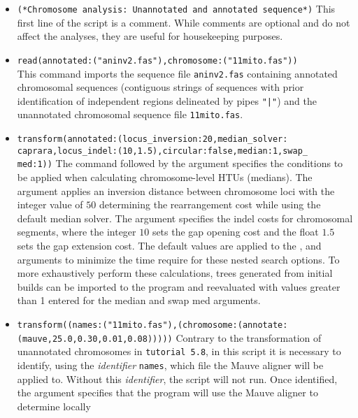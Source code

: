 \begin{itemize} 
\item \texttt{(*Chromosome analysis: Unannotated
and annotated sequence*)} This first line of the script is a comment.
While comments are optional and do not affect the analyses, they
are useful for housekeeping purposes.  
\item \texttt{read(annotated:("aninv2.fas"),chromosome:("11mito.fas"))}\\
This command imports the sequence file \texttt{aninv2.fas}
containing annotated chromosomal sequences (contiguous strings of
sequences with prior identification of independent regions delineated
by pipes \texttt{"|"}) and the unannotated chromosomal sequence
file \texttt{11mito.fas}.  
\item \texttt{transform(annotated:(locus\_inversion:20,median\_solver:\\
caprara,locus\_indel:(10,1.5),circular:false,median:1,swap\_\\
med:1))} The  command followed by the argument
 specifies the conditions to be applied when
calculating chromosome-level HTUs (medians). The argument
 applies an inversion distance between
chromosome loci with the integer value of $50$ determining the
rearrangement cost while using the default 
median solver. The argument  specifies
the indel costs for chromosomal segments, where the integer $10$
sets the gap opening cost and the float $1.5$ sets the gap extension
cost. The default values are applied to the ,
 and  arguments to
minimize the time require for these nested search options. To more
exhaustively perform these calculations, trees generated from initial
builds can be imported to the program and reevaluated with values
greater than 1 entered for the median and swap med arguments.  
\item \texttt{transform((names:("11mito.fas"),(chromosome:(annotate:\\(mauve,25.0,0.30,0.01,0.08)))))}
Contrary to the transformation of unannotated chromosomes in
\texttt{tutorial 5.8}, in this script it is necessary to identify,
using the \emph{identifier} \texttt{names}, which file the Mauve
aligner will be applied to. Without this \emph{identifier}, the
script will not run. Once identified, the argument
 specifies that the program will use
the Mauve aligner \cite{darlingetal2004} to determine locally

\end{itemize}
